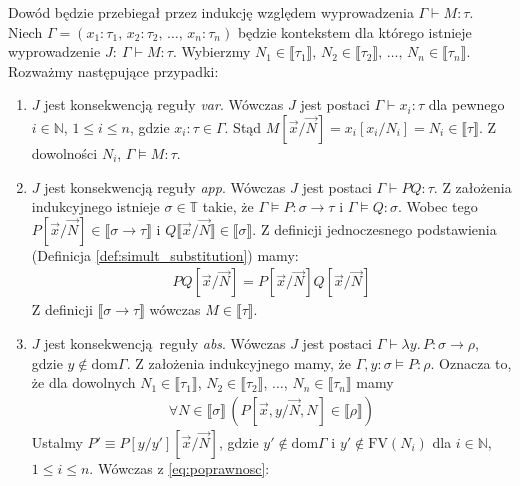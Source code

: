 \begin{dowod}
  Dowód będzie przebiegał przez indukcję względem wyprowadzenia \(\Gamma\vdash M:\tau\). Niech \(\Gamma=(x_1:\tau_1,\,x_2:\tau_2,\,\dots,\,x_n:\tau_n)\) będzie kontekstem dla którego istnieje wyprowadzenie \(J:\:\Gamma\vdash M:\tau\). Wybierzmy \(N_1\in\llbracket\tau_1 \rrbracket,\,N_2\in\llbracket\tau_2\rrbracket,\,\dots,\,N_n\in\llbracket\tau_n\rrbracket\). Rozważmy następujące przypadki:
  \begin{enumerate}[label=(\alph*)]
    \setlength\itemsep{0em}
    \item \(J\) jest konsekwencją reguły \emph{var}. Wówczas \(J\) jest postaci \(\Gamma \vdash x_i:\tau\) dla pewnego \(i\in\mathbb{N}\), \(1\leq i\leq n\), gdzie \(x_i:\tau\in\Gamma\). Stąd \(M[\vec{x}/\vec{N}]=x_i[x_i/N_i]=N_i\in\llbracket \tau \rrbracket\). Z dowolności \(N_i\), \(\Gamma\vDash M:\tau\).
    \item \(J\) jest konsekwencją reguły \emph{app}. Wówczas \(J\) jest postaci \(\Gamma\vdash PQ:\tau\). Z założenia indukcyjnego istnieje \(\sigma\in\mathbb{T}\) takie, że \(\Gamma\models P:\sigma\to\tau\) i \(\Gamma\models Q:\sigma\). Wobec tego \(P[\vec{x}/\vec{N}]\in\llbracket\sigma\to\tau\rrbracket\) i \(Q\llbracket \vec{x}/\vec{N} \rrbracket \in \llbracket \sigma \rrbracket\). Z definicji jednoczesnego podstawienia (Definicja \ref{def:simult_substitution}) mamy:
      \begin{align*}
        PQ[\vec{x}/\vec{N}]=P[\vec{x}/\vec{N}]Q[\vec{x}/\vec{N}]
      \end{align*}
      Z definicji \(\llbracket \sigma \to \tau \rrbracket\) wówczas \(M\in\llbracket \tau\rrbracket\).
    \item \(J\) jest konsekwencją reguły \emph{abs}. Wówczas \(J\) jest postaci \(\Gamma\vdash \lambda y.\,P:\sigma \to\rho\), gdzie \(y\not\in\mathrm{dom}\Gamma\). Z założenia indukcyjnego mamy, że \(\Gamma,y:\sigma\models P:\rho\). Oznacza to, że dla dowolnych \(N_1\in\llbracket\tau_1\rrbracket\), \(N_2\in\llbracket\tau_2\rrbracket\), \(\dots\), \(N_n\in\llbracket\tau_n\rrbracket\) mamy
    \begin{align} 
      \forall N\in\llbracket \sigma \rrbracket\, \left(
        P[\vec{x},y/\vec{N},N]\in\llbracket \rho \rrbracket \tag{\textasteriskcentered} \label{eq:poprawnosc}
      \right)
    \end{align} 
      Ustalmy \(P'\equiv P[y/y'][\vec{x}/\vec{N}]\), gdzie \(y'\not\in \mathrm{dom}\Gamma\) i \(y'\not \in \mathrm{FV}(N_i)\) dla \(i\in\mathbb{N}\), \(1\leq i\leq n\). Wówczas z \eqref{eq:poprawnosc}:

\end{enumerate}
\end{dowod}
